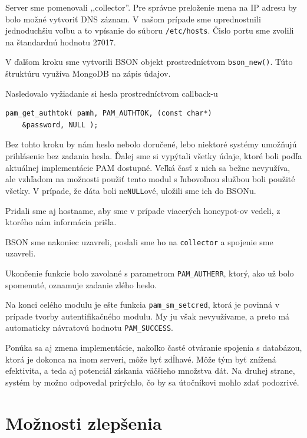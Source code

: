 \documentclass[12pt, oneside]{book}
\begin{document}
Server sme pomenovali ,,collector''.
Pre správne preloženie mena na IP adresu by bolo možné vytvoriť DNS záznam.
V našom prípade sme uprednostnili jednoduchšiu voľbu a to vpísanie do súboru \texttt{/etc/hosts}.
Čislo portu sme zvolili na štandardnú hodnotu 27017.

V ďalšom kroku sme vytvorili BSON objekt prostredníctvom \texttt{bson\_new()}.
Túto štruktúru využíva MongoDB na zápis údajov.

Nasledovalo vyžiadanie si hesla prostredníctvom callback-u 
\begin{lstlisting}[style=customC]
pam_get_authtok( pamh, PAM_AUTHTOK, (const char*)
    &password, NULL );
\end{lstlisting}

Bez tohto kroku by nám heslo nebolo doručené, lebo niektoré systémy umožňujú prihlásenie bez zadania hesla.
Ďalej sme si vypýtali všetky údaje, ktoré boli podľa aktuálnej implementácie PAM\cite{pam} dostupné.
Veľká časť z nich sa bežne nevyužíva, ale vzhľadom na možnosti použiť tento modul s ľubovoľnou službou boli použité všetky.
V prípade, že dáta boli ne\texttt{NULL}ové, uložili sme ich do BSONu.

Pridali sme aj hostname, aby sme v prípade viacerých honeypot-ov vedeli, z ktorého nám informácia prišla.

BSON sme nakoniec uzavreli, poslali sme ho na \texttt{collector} a spojenie sme uzavreli.

Ukončenie funkcie bolo zavolané s parametrom \texttt{PAM\_AUTHERR}, ktorý, ako už bolo spomenuté, oznamuje zadanie zlého heslo.

Na konci celého modulu je ešte funkcia \texttt{pam\_sm\_setcred}, ktorá je povinná v prípade tvorby autentifikačného modulu.
My ju však nevyužívame, a preto má automaticky návratovú hodnotu \texttt{PAM\_SUCCESS}.

Ponúka sa aj zmena implementácie, nakoľko časté otváranie spojenia s databázou, ktorá je dokonca na inom serveri, môže byť zdĺhavé.
Môže tým byť znížená efektivita, a teda aj potenciál získania väčšieho množstva dát.
Na druhej strane, systém by možno odpovedal prirýchlo, čo by sa útočníkovi mohlo zdať podozrivé.

\section{Možnosti zlepšenia}
\end{document}
